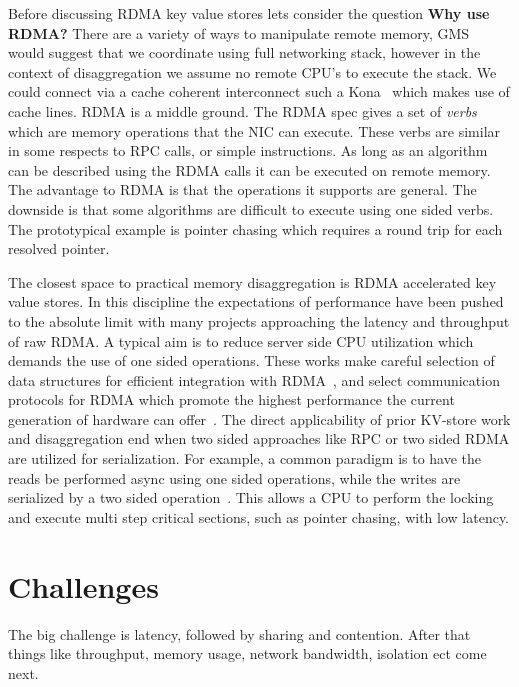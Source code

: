 Before discussing RDMA key value stores lets consider the question \textbf{Why
use RDMA?} There are a variety of ways to manipulate remote memory,
GMS~\cite{gms} would suggest that we coordinate using full networking stack,
however in the context of disaggregation we assume no remote CPU's to execute
the stack. We could connect via a cache coherent interconnect such a
Kona~\cite{kona} which makes use of cache lines. RDMA is a middle ground. The
RDMA spec gives a set of \textit{verbs} which are memory operations that the NIC
can execute. These verbs are similar in some respects to RPC calls, or simple
instructions. As long as an algorithm can be described using the RDMA calls it
can be executed on remote memory. The advantage to RDMA is that the operations
it supports are general. The downside is that some algorithms are difficult to
execute using one sided verbs. The prototypical example is pointer chasing which
requires a round trip for each resolved pointer.

The closest space to practical memory disaggregation is RDMA accelerated key
value stores. In this discipline the expectations of performance have been
pushed to the absolute limit with many projects approaching the latency and
throughput of raw RDMA. A typical aim is to reduce server side CPU utilization
which demands the use of one sided operations. These works make careful
selection of data structures for efficient integration with
RDMA~\cite{hopscotch,cuckoo}, and select communication protocols for RDMA which
promote the highest performance the current generation of hardware can
offer~\cite{herd,storm}. The direct applicability of prior KV-store work and
disaggregation end when two sided approaches like RPC or two sided RDMA are
utilized for serialization. For example, a common paradigm is to have the reads
be performed async using one sided operations, while the writes are serialized
by a two sided operation~\cite{pilaf}. This allows a CPU to perform the locking
and execute multi step critical sections, such as pointer chasing, with low
latency.



\section{Challenges}

The big challenge is latency, followed by sharing and contention. After that
things like throughput, memory usage, network bandwidth, isolation ect come
next.

